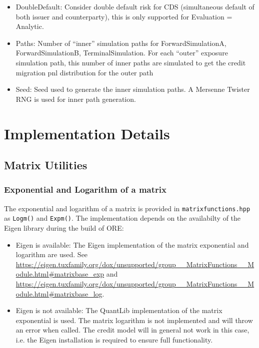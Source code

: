 \documentclass[12pt, a4paper]{article}
\begin{document}
\begin{itemize}
\item DoubleDefault: Consider double default risk for CDS (simultaneous default of both issuer and counterparty), this
  is only supported for Evaluation = Analytic.
\item Paths: Number of ``inner'' simulation paths for ForwardSimulationA, ForwardSimulationB, TerminalSimulation. For
    each ``outer'' exposure simulation path, this number of inner paths are simulated to get the credit migration pnl
    distribution for the outer path
\item Seed: Seed used to generate the inner simulation paths. A Mersenne Twister RNG is used for inner path generation.  
\end{itemize}

\section{Implementation Details}

\subsection{Matrix Utilities}

\subsubsection{Exponential and Logarithm of a matrix}

The exponential and logarithm of a matrix is provided in \verb+matrixfunctions.hpp+ as \verb+Logm()+ and \verb+Expm()+. The implementation depends on the availabilty of the Eigen library \cite{Eigen} during the build of ORE:

\begin{itemize}
\item Eigen is available: The Eigen implementation of the matrix exponential and logarithm are used. See \url{https://eigen.tuxfamily.org/dox/unsupported/group__MatrixFunctions__Module.html#matrixbase_exp} and \url{https://eigen.tuxfamily.org/dox/unsupported/group__MatrixFunctions__Module.html#matrixbase_log}.
\item Eigen is not available: The QuantLib implementation of the matrix exponential is used. The matrix logarithm is not implemented and will throw an error when called. The credit model will in general not work in this case, i.e. the Eigen installation is required to ensure full functionality.
\end{itemize}
\end{document}
